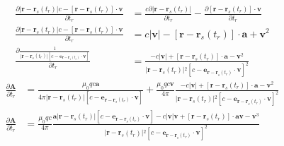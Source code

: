 \begin{align*}
    \frac{\partial \vert{}\boldsymbol{r} - \boldsymbol{r}_s(t_r)\vert{}c-\left[\boldsymbol{r} - \boldsymbol{r}_s(t_r)\right]\cdot\boldsymbol{v}}{\partial t_r}&=\frac{c\partial \vert{}\boldsymbol{r} - \boldsymbol{r}_s(t_r)\vert{}}{\partial t_r}
    -\frac{\partial \left[\boldsymbol{r} - \boldsymbol{r}_s(t_r)\right]\cdot\boldsymbol{v}}{\partial t_r}\\
    \frac{\partial \vert{}\boldsymbol{r} - \boldsymbol{r}_s(t_r)\vert{}c-\left[\boldsymbol{r} - \boldsymbol{r}_s(t_r)\right]\cdot\boldsymbol{v}}{\partial t_r}&=c\vert{}\boldsymbol{v}\vert{}
    -\left[\boldsymbol{r} - \boldsymbol{r}_s(t_r)\right]\cdot\boldsymbol{a}
    +\boldsymbol{v}^2\\
    \frac{\partial \frac{1}{\vert{}\boldsymbol{r} - \boldsymbol{r}_s(t_r)\vert{}\left[c-\boldsymbol{e}_{\boldsymbol{r} -\boldsymbol{r}_s(t_r)}\cdot\boldsymbol{v}\right]}}{\partial t_r}&=
    \frac{-c\vert{}\boldsymbol{v}\vert{}
    +\left[\boldsymbol{r} - \boldsymbol{r}_s(t_r)\right]\cdot\boldsymbol{a}
    -\boldsymbol{v}^2}{\vert{}\boldsymbol{r} - \boldsymbol{r}_s(t_r)\vert{}^2\left[c-\boldsymbol{e}_{\boldsymbol{r} -\boldsymbol{r}_s(t_r)}\cdot\boldsymbol{v}\right]^2}
\end{align*}
\begin{align*}
    \frac{\partial\boldsymbol{A}}{\partial t_r}&=\frac{\mu_0qc\boldsymbol{a}}{4\pi\vert{}\boldsymbol{r} - \boldsymbol{r}_s(t_r)\vert{}\left[c-\boldsymbol{e}_{\boldsymbol{r} -\boldsymbol{r}_s(t_r)}\cdot\boldsymbol{v}\right]}
    +\frac{\mu_0qc\boldsymbol{v}}{4\pi}\frac{-c\vert{}\boldsymbol{v}\vert{}
    +\left[\boldsymbol{r} - \boldsymbol{r}_s(t_r)\right]\cdot\boldsymbol{a}
    -\boldsymbol{v}^2}{\vert{}\boldsymbol{r} - \boldsymbol{r}_s(t_r)\vert{}^2\left[c-\boldsymbol{e}_{\boldsymbol{r} -\boldsymbol{r}_s(t_r)}\cdot\boldsymbol{v}\right]^2}\\
    \frac{\partial\boldsymbol{A}}{\partial t_r}&=
    \frac{\mu_0qc}{4\pi}\frac{\boldsymbol{a}\vert{}\boldsymbol{r} - \boldsymbol{r}_s(t_r)\vert{}\left[c-\boldsymbol{e}_{\boldsymbol{r} -\boldsymbol{r}_s(t_r)}\cdot\boldsymbol{v}\right]
    -c\vert{}\boldsymbol{v}\vert{}\boldsymbol{v}
    +\left[\boldsymbol{r} - \boldsymbol{r}_s(t_r)\right]\cdot\boldsymbol{a}\boldsymbol{v}
    -\boldsymbol{v}^3}{\vert{}\boldsymbol{r} - \boldsymbol{r}_s(t_r)\vert{}^2\left[c-\boldsymbol{e}_{\boldsymbol{r} -\boldsymbol{r}_s(t_r)}\cdot\boldsymbol{v}\right]^2}
\end{align*}
